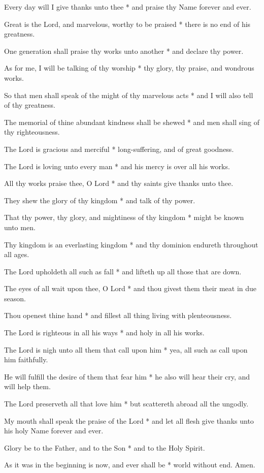 \begin{multicols}{2}
	Every day will I give thanks unto thee * and praise thy Name forever and ever.
	
	Great is the Lord, and marvelous, worthy to be praised * there is no end of his greatness.
	
	One generation shall praise thy works unto another * and declare thy power.
	
	As for me, I will be talking of thy worship * thy glory, thy praise, and wondrous works.
	
	So that men shall speak of the might of thy marvelous acts * and I will also tell of thy greatness.
	
	The memorial of thine abundant kindness shall be shewed * and men shall sing of thy righteousness.
	
	The Lord is gracious and merciful * long-suffering, and of great goodness.
	
	The Lord is loving unto every man * and his mercy is over all his works.
	
	All thy works praise thee, O Lord * and thy saints give thanks unto thee.
	
	They shew the glory of thy kingdom * and talk of thy power.
	
	That thy power, thy glory, and mightiness of thy kingdom * might be known unto men.
	
	Thy kingdom is an everlasting kingdom * and thy dominion endureth throughout all ages.
	
	The Lord upholdeth all such as fall * and lifteth up all those that are down.
	
	The eyes of all wait upon thee, O Lord * and thou givest them their meat in due season.
	
	Thou openest thine hand * and fillest all thing living with plenteousness.
	
	The Lord is righteous in all his ways * and holy in all his works.
	
	The Lord is nigh unto all them that call upon him * yea, all such as call upon him faithfully.
	
	He will fulfill the desire of them that fear him * he also will hear their cry, and will help them.
	
	The Lord preserveth all that love him * but scattereth abroad all the ungodly.
	
	My mouth shall speak the praise of the Lord * and let all flesh give thanks unto his holy Name forever and ever.
	
	Glory be to the Father, and to the Son * and to the Holy Spirit.
	
	As it was in the beginning is now, and ever shall be * world without end. Amen.
\end{multicols}